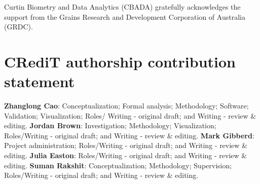 \documentclass[a4paper]{article} 	%
\begin{document}
Curtin Biometry and Data Analytics (CBADA) gratefully acknowledges the support from the Grains Research and Development Corporation of Australia (GRDC).

\section*{CRediT authorship contribution statement}

\textbf{Zhanglong Cao}: Conceptualization; Formal analysis; Methodology; Software; Validation; Visualization; Roles/ Writing - original draft; and Writing - review \& editing. \textbf{Jordan Brown}: Investigation; Methodology; Visualization; Roles/Writing - original draft; and Writing - review \& editing. \textbf{Mark Gibberd}: Project administration; Roles/Writing - original draft; and Writing - review \& editing. \textbf{Julia Easton}: Roles/Writing - original draft; and Writing - review \& editing. \textbf{Suman Rakshit}: Conceptualization; Methodology; Supervision; Roles/Writing - original draft; and Writing - review \& editing. 


\renewcommand\bibname{References}%
\printbibliography
\end{document}
